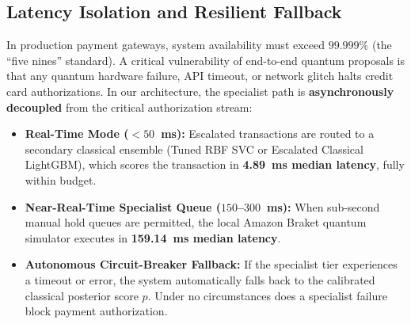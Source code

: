 \documentclass[10pt,a4paper]{article}
\begin{document}
\subsection{Latency Isolation and Resilient Fallback}
In production payment gateways, system availability must exceed $99.999\%$ (the ``five nines'' standard). A critical vulnerability of end-to-end quantum proposals is that any quantum hardware failure, API timeout, or network glitch halts credit card authorizations. 
In our architecture, the specialist path is \textbf{asynchronously decoupled} from the critical authorization stream:
\begin{itemize}[leftmargin=*,itemsep=0.4pt,topsep=1pt]
\item \textbf{Real-Time Mode ($<50$~ms):} Escalated transactions are routed to a secondary classical ensemble (Tuned RBF SVC or Escalated Classical LightGBM), which scores the transaction in \textbf{4.89~ms median latency}, fully within budget.
\item \textbf{Near-Real-Time Specialist Queue ($150$--$300$~ms):} When sub-second manual hold queues are permitted, the local Amazon Braket quantum simulator executes in \textbf{159.14~ms median latency}.
\item \textbf{Autonomous Circuit-Breaker Fallback:} If the specialist tier experiences a timeout or error, the system automatically falls back to the calibrated classical posterior score $p$. Under no circumstances does a specialist failure block payment authorization.
\end{itemize}
\end{document}
